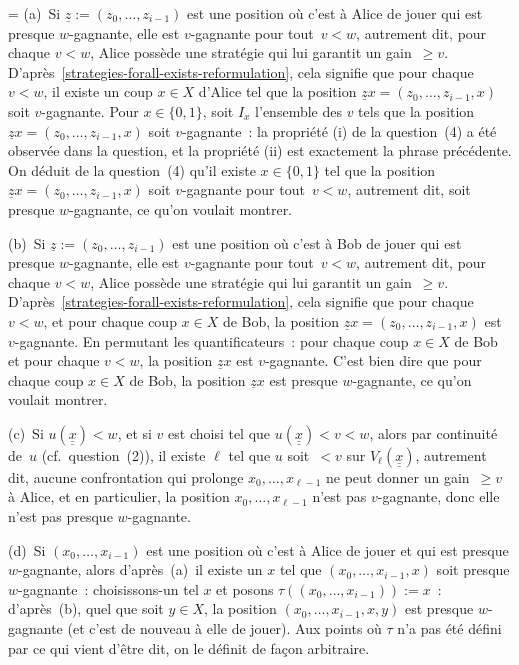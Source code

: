 \documentclass[12pt,a4paper]{article}
\theoremstyle{definition}
\newcommand{\dblunderline}[1]{\underline{\underline{#1}}}
\newif\ifcorrige
\newenvironment{corrige}%
{\ifcorrige\relax\else\setbox0=\vbox\bgroup\fi%
\smallbreak\noindent{\underbar{\textit{Corrigé.}}\quad}}
{{\hbox{}\nobreak\hfill\checkmark}%
\ifcorrige\relax\else\egroup\fi\par}
\begin{document}
\begin{corrige}
(a) Si $\underline{z} := (z_0,\ldots,z_{i-1})$ est une position où
  c'est à Alice de jouer qui est presque $w$-gagnante, elle est
  $v$-gagnante pour tout $v < w$, autrement dit, pour chaque $v < w$,
  Alice possède une stratégie qui lui garantit un gain $\geq v$.
  D'après \ref{strategies-forall-exists-reformulation}, cela signifie
  que pour chaque $v < w$, il existe un coup $x \in X$ d'Alice tel que
  la position $\underline{z}x = (z_0,\ldots,z_{i-1},x)$ soit
  $v$-gagnante.  Pour $x \in \{0,1\}$, soit $I_x$ l'ensemble des $v$
  tels que la position $\underline{z}x = (z_0,\ldots,z_{i-1},x)$ soit
  $v$-gagnante : la propriété (i) de la question (4) a été observée
  dans la question, et la propriété (ii) est exactement la phrase
  précédente.  On déduit de la question (4) qu'il existe $x \in
  \{0,1\}$ tel que la position $\underline{z}x =
  (z_0,\ldots,z_{i-1},x)$ soit $v$-gagnante pour tout $v<w$, autrement
  dit, soit presque $w$-gagnante, ce qu'on voulait montrer.

(b) Si $\underline{z} := (z_0,\ldots,z_{i-1})$ est une position où
  c'est à Bob de jouer qui est presque $w$-gagnante, elle est
  $v$-gagnante pour tout $v < w$, autrement dit, pour chaque $v < w$,
  Alice possède une stratégie qui lui garantit un gain $\geq v$.
  D'après \ref{strategies-forall-exists-reformulation}, cela signifie
  que pour chaque $v < w$, et pour chaque coup $x \in X$ de Bob, la
  position $\underline{z}x = (z_0,\ldots,z_{i-1},x)$ est $v$-gagnante.
  En permutant les quantificateurs : pour chaque coup $x \in X$ de Bob
  et pour chaque $v < w$, la position $\underline{z}x$ est
  $v$-gagnante.  C'est bien dire que pour chaque coup $x\in X$ de Bob,
  la position $\underline{z}x$ est presque $w$-gagnante, ce qu'on
  voulait montrer.

(c) Si $u(\dblunderline{x}) < w$, et si $v$ est choisi tel que
  $u(\dblunderline{x}) < v < w$, alors par continuité de $u$
  (cf. question (2)), il existe $\ell$ tel que $u$ soit $<v$ sur
  $V_\ell(\dblunderline{x})$, autrement dit, aucune confrontation qui
  prolonge $x_0,\ldots,x_{\ell-1}$ ne peut donner un gain $\geq v$ à
  Alice, et en particulier, la position $x_0,\ldots,x_{\ell-1}$ n'est
  pas $v$-gagnante, donc elle n'est pas presque $w$-gagnante.

(d) Si $(x_0,\ldots,x_{i-1})$ est une position où c'est à Alice de
  jouer et qui est presque $w$-gagnante, alors d'après (a) il existe
  un $x$ tel que $(x_0,\ldots,x_{i-1},x)$ soit presque $w$-gagnante :
  choisissons-un tel $x$ et posons $\tau((x_0,\ldots,x_{i-1})) := x$ :
  d'après (b), quel que soit $y \in X$, la position
  $(x_0,\ldots,x_{i-1},x,y)$ est presque $w$-gagnante (et c'est de
  nouveau à elle de jouer).  Aux points où $\tau$ n'a pas été défini
  par ce qui vient d'être dit, on le définit de façon arbitraire.


\end{corrige}
\end{document}
